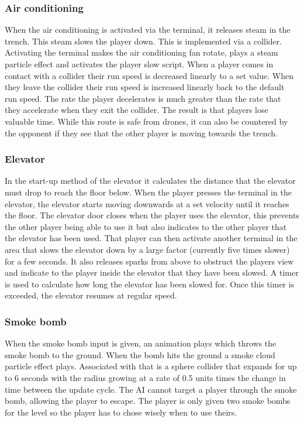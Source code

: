 \documentclass[11pt,a4paper]{article}
\begin{document}
\subsubsection{Air conditioning}
When the air conditioning is activated via the terminal, it releases steam in the trench. This steam slows the player down. This is implemented via a collider. Activating the terminal makes the air conditioning fan rotate, plays a steam particle effect and activates the player slow script. When a player comes in contact with a collider their run speed is decreased linearly to a set value. When they leave the collider their run speed is increased linearly back to the default run speed. The rate the player decelerates is much greater than the rate that they accelerate when they exit the collider. The result is that players lose valuable time. While this route is safe from drones, it can also be countered by the opponent if they see that the other player is moving towards the trench.
\subsubsection{Elevator}
In the start-up method of the elevator it calculates the distance that the elevator must drop to reach the floor below. When the player presses the terminal in the elevator, the elevator starts moving downwards at a set velocity until it reaches the floor. The elevator door closes when the player uses the elevator, this prevents the other player being able to use it but also indicates to the other player that the elevator has been used. That player can then activate another terminal in the area that slows the elevator down by a large factor (currently five times slower) for a few seconds. It also releases sparks from above to obstruct the players view and indicate to the player inside the elevator that they have been slowed. A timer is used to calculate how long the elevator has been slowed for. Once this timer is exceeded, the elevator resumes at regular speed.
\subsubsection{Smoke bomb}
When the smoke bomb input is given, an animation plays which throws the smoke bomb to the ground. When the bomb hits the ground a smoke cloud particle effect plays. Associated with that is a sphere collider that expands for up to 6 seconds with the radius growing at a rate of 0.5 units times the change in time between the update cycle. The AI cannot target a player through the smoke bomb, allowing the player to escape. The player is only given two smoke bombs for the level so the player has to chose wisely when to use theirs.
\end{document}
